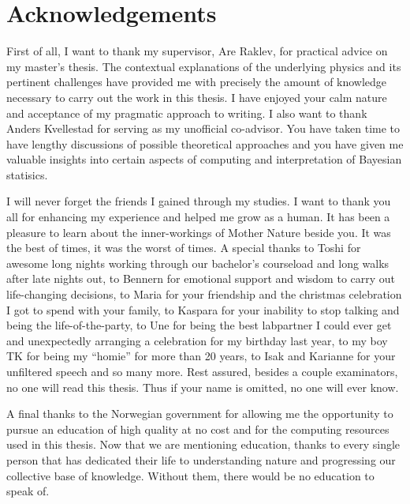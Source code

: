 \chapter*{Acknowledgements}
First of all, I want to thank my supervisor, Are Raklev, for practical advice on my master's thesis. The contextual explanations of the underlying physics and its pertinent challenges have provided me with precisely the amount of knowledge necessary to carry out the work in this thesis. I have enjoyed your calm nature and acceptance of my pragmatic approach to writing. I also want to thank Anders Kvellestad for serving as my unofficial co-advisor. You have taken time to have lengthy discussions of possible theoretical approaches and you have given me valuable insights into certain aspects of computing and interpretation of Bayesian statisics. 

I will never forget the friends I gained through my studies. I want to thank you all for enhancing my experience and helped me grow as a human. It has been a pleasure to learn about the inner-workings of Mother Nature beside you. It was the best of times, it was the worst of times. A special thanks to Toshi for awesome long nights working through our bachelor's courseload and long walks after late nights out, to Bennern for emotional support and wisdom to carry out life-changing decisions, to Maria for your friendship and the christmas celebration I got to spend with your family, to Kaspara for your inability to stop talking and being the life-of-the-party, to Une for being the best labpartner I could ever get and unexpectedly arranging a celebration for my birthday last year, to my boy TK for being my ``homie'' for more than 20 years, to Isak and Karianne for your unfiltered speech and so many more. Rest assured, besides a couple examinators, no one will read this thesis. Thus if your name is omitted, no one will ever know.

A final thanks to the Norwegian government for allowing me the opportunity to pursue an education of high quality at no cost and for the computing resources used in this thesis. Now that we are mentioning education, thanks to every single person that has dedicated their life to understanding nature and progressing our collective base of knowledge. Without them, there would be no education to speak of. 
